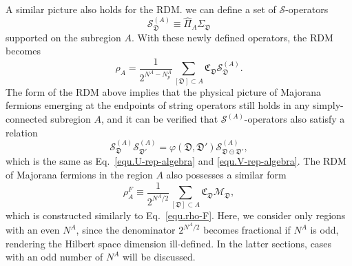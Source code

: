 A similar picture also holds for the RDM. we can  define a set of $\mathcal{S}$-operators
\begin{equation}\label{equ.U-A-def}
    \mathcal{S}^{(A)}_\mathfrak{D} \equiv \hat{\Pi}_A\Sigma_\mathfrak{D}
\end{equation}
supported on the subregion $A$. With these newly defined operators, the RDM becomes
\begin{equation}\label{equ.red-DM-new}
    \rho_A = \frac{1}{2^{N^A-N^A_p}}\sum_{[\mathfrak{D}]\subset A}\mathfrak{C}_{\mathfrak{D}}\mathcal{S}^{(A)}_\mathfrak{D}.
\end{equation}
The form of the RDM above implies that the physical picture of Majorana fermions emerging at the endpoints of string operators still holds in any simply-connected subregion $A$, and it can be verified that $\mathcal{S}^{(A)}$-operators also satisfy a relation
\begin{equation}\label{equ.U-A-rep-algebra}
    \mathcal{S}^{(A)}_{\mathfrak{D}}\mathcal{S}^{(A)}_{\mathfrak{D}'} = \varphi(\mathfrak{D},\mathfrak{D}')\mathcal{S}^{(A)}_{\mathfrak{D}\ominus\mathfrak{D}'},
\end{equation}
which is the same as Eq.~\eqref{equ.U-rep-algebra} and \eqref{equ.V-rep-algebra}. The RDM of Majorana fermions in the region $A$ also possesses a similar form 
\begin{equation}\label{equ.rho-F-reduced}
    \rho_A^{F} \equiv \frac{1}{2^{N^A/2}}\sum_{[\mathfrak{D}]\subset A}\mathfrak{C}_{\mathfrak{D}}\mathcal{M}_\mathfrak{D},
\end{equation}
which is constructed similarly to Eq.~\eqref{equ.rho-F}. Here, we consider only regions with an even $N^A$, since the denominator $2^{N^A/2}$ becomes fractional if $N^A$ is odd, rendering the Hilbert space dimension ill-defined. In the latter sections, cases with an odd number of $N^A$ will be discussed. 

